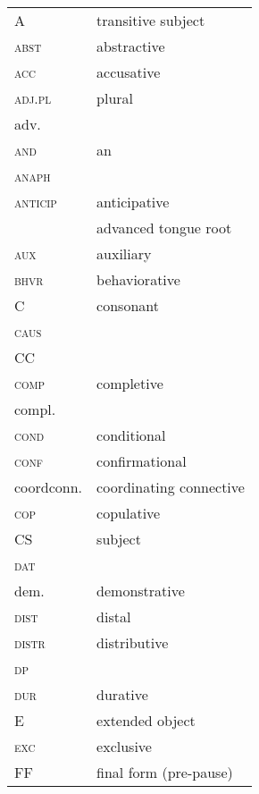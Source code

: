  


\begin{tabularx}{.48\textwidth}{lQ} 
A					&	 transitive subject \\
\textsc{abst}		&	 abstractive \\
\textsc{acc}        &    accusative \\
\textsc{adj.pl}		&	  plural \\
adv.				&	  \\
\textsc{and}		&	 an \\
\textsc{anaph}		&	  \\
\textsc{anticip}	&	 anticipative \\
					&	 advanced tongue root \\
\textsc{aux}		&	 auxiliary \\
\textsc{bhvr}		&	 behaviorative \\
C					&	 consonant \\
\textsc{caus}		&	  \\
CC					&	   \\
\textsc{comp}		&	 completive \\
compl.				&	  \\
\textsc{cond}		&	 conditional \\
\textsc{conf}		& 	 confirmational \\
coordconn.			&	 coordinating connective \\
\textsc{cop}		&	 copulative \\
CS					&	  subject \\
\textsc{dat}        &     \\
dem.				&	 demonstrative \\
\textsc{dist}		&	 distal \\
\textsc{distr}		&	 distributive \\
\textsc{dp}			&	  \\
\textsc{dur}		&	 durative \\
E					&	 extended object \\
\textsc{exc}		&	 exclusive \\
FF					&	 final form (pre-pause)\\
\end{tabularx} 
